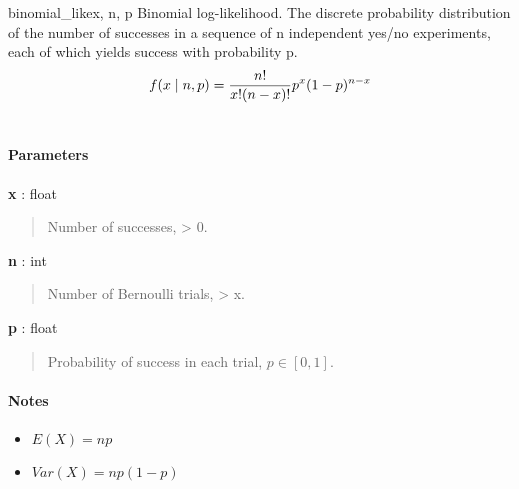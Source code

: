 \hypertarget{pymc.distributions.binomial_like}{}
\begin{funcdesc}{binomial\_like}{x, n, p}
Binomial log-likelihood.  The discrete probability distribution of the
number of successes in a sequence of n independent yes/no experiments,
each of which yields success with probability p.
\begin{gather}
\begin{split}f(x \mid n, p) = \frac{n!}{x!(n-x)!} p^x (1-p)^{n-x}\end{split}\notag\\\begin{split}\end{split}\notag
\end{gather}
\paragraph{Parameters}
\begin{paramlist}
\item[] \textbf{x} : float
\begin{quote}

Number of successes, \textgreater{} 0.
\end{quote}

\item[]  \textbf{n} : int
\begin{quote}

Number of Bernoulli trials, \textgreater{} x.
\end{quote}

\item[] \textbf{p} : float
\begin{quote}

Probability of success in each trial, $p \in [0,1]$.
\end{quote}
\end{paramlist}
\paragraph{Notes}
\begin{itemize}
\item {} 
$E(X)=np$

\item {} 
$Var(X)=np(1-p)$

\end{itemize}
\end{funcdesc}


